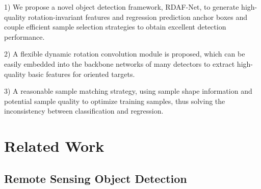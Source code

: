 \documentclass[10pt,twocolumn,final]{article}
\begin{document}
1) We propose a novel object detection framework, RDAF-Net, to generate high-quality rotation-invariant features and regression prediction anchor boxes and couple efficient sample selection strategies to obtain excellent detection performance.

2) A flexible dynamic rotation convolution module is proposed, which can be easily embedded into the backbone networks of many detectors to extract high-quality basic features for oriented targets.

3) A reasonable sample matching strategy, using sample shape information and potential sample quality to optimize training samples, thus solving the inconsistency between classification and regression.

\section{ Related Work }

\subsection{ Remote Sensing Object Detection }
\end{document}

